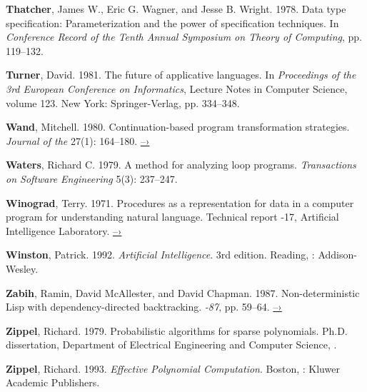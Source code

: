  \label{Thatcher et al. 1978}
\textbf{Thatcher}, James W., Eric G. Wagner, and Jesse B. Wright. 1978.  Data type
specification: Parameterization and the power of specification techniques. In
\textit{Conference Record of the Tenth Annual  Symposium on Theory
of Computing}, pp. 119--132.

 \label{Turner 1981}
\textbf{Turner}, David.  1981.  The future of applicative languages.  In
\textit{Proceedings of the 3rd European Conference on Informatics}, Lecture Notes
in Computer Science, volume 123. New York: Springer-Verlag, pp.  334--348.

 \label{Wand 1980}
\textbf{Wand}, Mitchell.  1980.  Continuation-based program transformation strategies.
\textit{Journal of the } 27(1): 164--180.
\href{http://www.diku.dk/OLD/undervisning/2005e/224/papers/Wand80.pdf}{–›}

 \label{Waters (1979)}
\textbf{Waters}, Richard C.  1979.  A method for analyzing loop programs.
\textit{ Transactions on Software Engineering} 5(3): 237--247.

\textbf{Winograd}, Terry.  1971.  Procedures as a representation for data in a computer
program for understanding natural language.  Technical report -17,
 Artificial Intelligence Laboratory.
\href{http://dspace.mit.edu/handle/1721.1/7095}{–›}

 \label{Winston 1992}
\textbf{Winston}, Patrick. 1992. \textit{Artificial Intelligence}.  3rd edition.  Reading,
: Addison-Wesley.

 \label{Zabih et al. 1987}
\textbf{Zabih}, Ramin, David McAllester, and David Chapman.  1987.  Non-deterministic
Lisp with dependency-directed backtracking.  \textit{-87},
pp. 59--64.
\href{http://www.aaai.org/Papers/AAAI/1987/AAAI87-011.pdf}{–›}

 \label{Zippel (1979)}
\textbf{Zippel}, Richard.  1979.  Probabilistic algorithms for sparse polynomials.
Ph.D. dissertation, Department of Electrical Engineering and Computer Science,
.

 \label{Zippel 1993}
\textbf{Zippel}, Richard.  1993.  \textit{Effective Polynomial Computation}.  Boston, :
Kluwer Academic Publishers.


